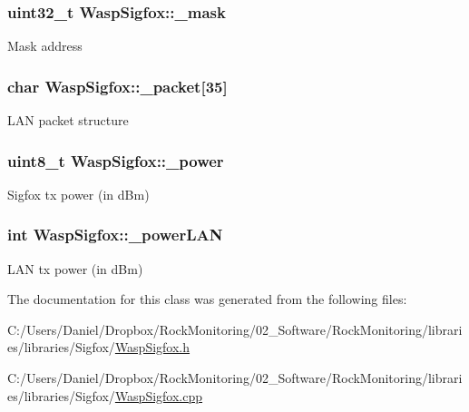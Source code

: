 \subsubsection[{\texorpdfstring{\+\_\+mask}{_mask}}]{\setlength{\rightskip}{0pt plus 5cm}uint32\+\_\+t Wasp\+Sigfox\+::\+\_\+mask}\hypertarget{class_wasp_sigfox_a22ea5bda7954717c4e57880c2ca890eb}{}\label{class_wasp_sigfox_a22ea5bda7954717c4e57880c2ca890eb}
Mask address 
\subsubsection[{\texorpdfstring{\+\_\+packet}{_packet}}]{\setlength{\rightskip}{0pt plus 5cm}char Wasp\+Sigfox\+::\+\_\+packet\mbox{[}35\mbox{]}}\hypertarget{class_wasp_sigfox_aaf5e5e719c7fde306d87c3826153408c}{}\label{class_wasp_sigfox_aaf5e5e719c7fde306d87c3826153408c}
L\+AN packet structure 
\subsubsection[{\texorpdfstring{\+\_\+power}{_power}}]{\setlength{\rightskip}{0pt plus 5cm}uint8\+\_\+t Wasp\+Sigfox\+::\+\_\+power}\hypertarget{class_wasp_sigfox_a38f7ee3421760c13f078d885fbb36528}{}\label{class_wasp_sigfox_a38f7ee3421760c13f078d885fbb36528}
Sigfox tx power (in d\+Bm) 
\subsubsection[{\texorpdfstring{\+\_\+power\+L\+AN}{_powerLAN}}]{\setlength{\rightskip}{0pt plus 5cm}int Wasp\+Sigfox\+::\+\_\+power\+L\+AN}\hypertarget{class_wasp_sigfox_ab28fc2a3de3d225b34415febccd0a64a}{}\label{class_wasp_sigfox_ab28fc2a3de3d225b34415febccd0a64a}
L\+AN tx power (in d\+Bm) 

The documentation for this class was generated from the following files\+:\begin{DoxyCompactItemize}
\item 
C\+:/\+Users/\+Daniel/\+Dropbox/\+Rock\+Monitoring/02\+\_\+\+Software/\+Rock\+Monitoring/libraries/libraries/\+Sigfox/\hyperlink{_wasp_sigfox_8h}{Wasp\+Sigfox.\+h}\item 
C\+:/\+Users/\+Daniel/\+Dropbox/\+Rock\+Monitoring/02\+\_\+\+Software/\+Rock\+Monitoring/libraries/libraries/\+Sigfox/\hyperlink{_wasp_sigfox_8cpp}{Wasp\+Sigfox.\+cpp}\end{DoxyCompactItemize}
